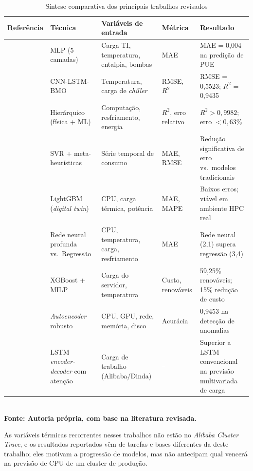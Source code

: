 \documentclass[a4paper,12pt]{article}
\begin{document}
\begin{table}[htb]
\caption{Síntese comparativa dos principais trabalhos revisados}
\label{tab:sintese-literatura}
\centering
\scriptsize
\setlength{\tabcolsep}{3pt}
\renewcommand{\arraystretch}{1.05}
\begin{tabularx}{\textwidth}{|P{3.1cm}|P{1.8cm}|Y|P{1.3cm}|P{2.3cm}|}
\hline
\textbf{Referência} & \textbf{Técnica} & \textbf{Variáveis de entrada} & \textbf{Métrica} & \textbf{Resultado} \\
\hline
\cite{gao2014} & MLP (5 camadas) & Carga TI, temperatura, entalpia, bombas & MAE & MAE = 0{,}004 na predição de PUE \\
\hline
\cite{sulaiman2025cnn} & CNN-LSTM-BMO & Temperatura, carga de \textit{chiller} & RMSE, $R^2$ & RMSE = 0{,}5523; $R^2$ = 0{,}9435 \\
\hline
\cite{zhou2025load} & Hierárquico (física + ML) & Computação, resfriamento, energia & $R^2$, erro relativo & $R^2 > 0{,}9982$; erro $< 0{,}63\%$ \\
\hline
\cite{xiong2026} & SVR + meta-heurísticas & Série temporal de consumo & MAE, RMSE & Redução significativa de erro vs.\ modelos tradicionais \\
\hline
\cite{veigas2025digital} & LightGBM (\textit{digital twin}) & CPU, carga térmica, potência & MAE, MAPE & Baixos erros; viável em ambiente HPC real \\
\hline
\cite{jonnalagadda2025ai} & Rede neural profunda vs.\ Regressão & CPU, temperatura, carga, resfriamento & MAE & Rede neural (2{,}1) supera regressão (3{,}4) \\
\hline
\cite{shaffi2026} & XGBoost + MILP & Carga do servidor, temperatura & Custo, renováveis & 59{,}25\% renováveis; 15\% redução de custo \\
\hline
\cite{11470282} & \textit{Autoencoder} robusto & CPU, GPU, rede, memória, disco & Acurácia & 0{,}9453 na detecção de anomalias \\
\hline
\cite{zhu2019attention} & LSTM \textit{encoder-decoder} com atenção & Carga de trabalho (Alibaba/Dinda) & -- & Superior a LSTM convencional na previsão multivariada de carga \\
\hline
\end{tabularx}
\\[0.3cm]
\textbf{\footnotesize Fonte: Autoria própria, com base na literatura revisada.}
\end{table}

As variáveis térmicas recorrentes nesses trabalhos não estão no \textit{Alibaba Cluster Trace}, e os resultados reportados vêm de tarefas e bases diferentes da deste trabalho; eles motivam a progressão de modelos, mas não antecipam qual vencerá na previsão de CPU de um cluster de produção.
\end{document}
